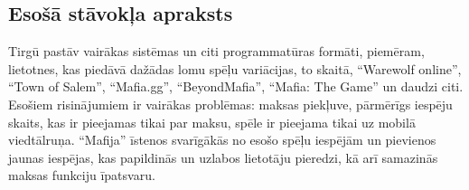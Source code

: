 \subsection{Esošā stāvokļa apraksts}
Tirgū pastāv vairākas sistēmas un citi programmatūras formāti, piemēram,
lietotnes, kas piedāvā dažādas lomu spēļu variācijas, to skaitā, ``Warewolf
online'', ``Town of Salem'', ``Mafia.gg'', ``BeyondMafia'', ``Mafia: The Game''
un daudzi citi. Esošiem risinājumiem ir vairākas problēmas: maksas piekļuve,
pārmērīgs iespēju skaits, kas ir pieejamas tikai par maksu, spēle ir pieejama
tikai uz mobilā viedtālruņa. ``Mafija'' īstenos svarīgākās no esošo spēļu
iespējām un pievienos jaunas iespējas, kas papildinās un uzlabos lietotāju
pieredzi, kā arī samazinās maksas funkciju īpatsvaru.
